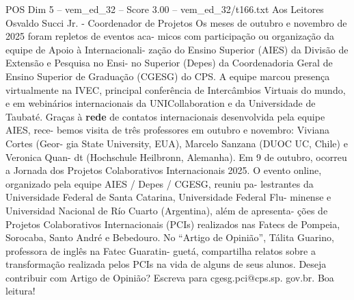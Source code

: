 \begin{textsample}{POS Dim 5 – vem\_ed\_32 – Score 3.00 – vem\_ed\_32/t166.txt}  \label{ex:f5_pos_027}
Aos Leitores Osvaldo Succi Jr. - Coordenador de Projetos Os meses de outubro e novembro de 2025 foram repletos de eventos aca- micos com participação ou organização da equipe de Apoio à Internacionali- zação do Ensino Superior (AIES) da Divisão de Extensão e Pesquisa no Ensi- no Superior (Depes) da Coordenadoria Geral de Ensino Superior de Graduação (CGESG) do CPS.
A equipe marcou presença virtualmente na IVEC, principal conferência de Intercâmbios Virtuais do mundo, e em webinários internacionais da UNICollaboration e da Universidade de Taubaté.
Graças à \textbf{rede} de contatos internacionais desenvolvida pela equipe AIES, rece- bemos visita de três professores em outubro e novembro: Viviana Cortes (Geor- gia State University, EUA), Marcelo Sanzana (DUOC UC, Chile) e Veronica Quan- dt (Hochschule Heilbronn, Alemanha).
Em 9 de outubro, ocorreu a Jornada dos Projetos Colaborativos Internacionais 2025.
O evento online, organizado pela equipe AIES / Depes / CGESG, reuniu pa- lestrantes da Universidade Federal de Santa Catarina, Universidade Federal Flu- minense e Universidad Nacional de Río Cuarto (Argentina), além de apresenta- ções de Projetos Colaborativos Internacionais (PCIs) realizados nas Fatecs de Pompeia, Sorocaba, Santo André e Bebedouro.
No “Artigo de Opinião”, Tálita Guarino, professora de inglês na Fatec Guaratin- guetá, compartilha relatos sobre a transformação realizada pelos PCIs na vida de alguns de seus alunos.
Deseja contribuir com Artigo de Opinião?
Escreva para cgesg.pci@cps.sp. gov.br.
Boa leitura!

\end{textsample}
